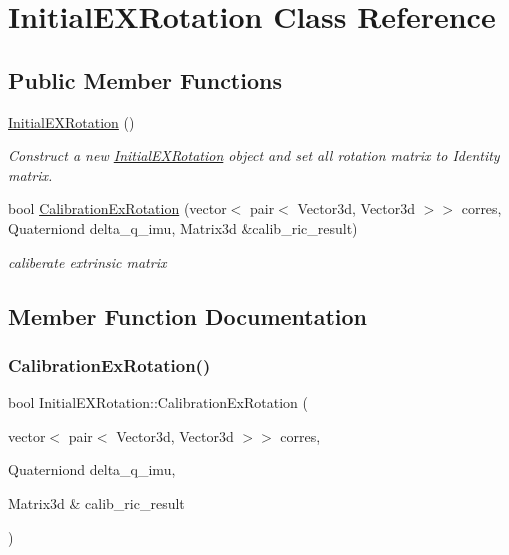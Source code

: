 \hypertarget{classInitialEXRotation}{}\section{Initial\+E\+X\+Rotation Class Reference}
\label{classInitialEXRotation}
\subsection*{Public Member Functions}
\begin{DoxyCompactItemize}
\item 
\mbox{\label{classInitialEXRotation_ad8401b1a0623b248681568c5486c83a0}} 
\hyperlink{classInitialEXRotation_ad8401b1a0623b248681568c5486c83a0}{Initial\+E\+X\+Rotation} ()
\begin{DoxyCompactList}\small\item\em Construct a new \hyperlink{classInitialEXRotation}{Initial\+E\+X\+Rotation} object and set all rotation matrix to Identity matrix. \end{DoxyCompactList}\item 
bool \hyperlink{classInitialEXRotation_af2c4af3befcb13b52bb76ad96fb51235}{Calibration\+Ex\+Rotation} (vector$<$ pair$<$ Vector3d, Vector3d $>$$>$ corres, Quaterniond delta\+\_\+q\+\_\+imu, Matrix3d \&calib\+\_\+ric\+\_\+result)
\begin{DoxyCompactList}\small\item\em caliberate extrinsic matrix \end{DoxyCompactList}\end{DoxyCompactItemize}


\subsection{Member Function Documentation}
\mbox{\label{classInitialEXRotation_af2c4af3befcb13b52bb76ad96fb51235}} 
\subsubsection{\texorpdfstring{Calibration\+Ex\+Rotation()}{CalibrationExRotation()}}
{\footnotesize\ttfamily bool Initial\+E\+X\+Rotation\+::\+Calibration\+Ex\+Rotation (\begin{DoxyParamCaption}\item[{vector$<$ pair$<$ Vector3d, Vector3d $>$$>$}]{corres,  }\item[{Quaterniond}]{delta\+\_\+q\+\_\+imu,  }\item[{Matrix3d \&}]{calib\+\_\+ric\+\_\+result }\end{DoxyParamCaption})}



